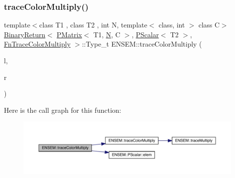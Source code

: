 \subsubsection{\texorpdfstring{traceColorMultiply()}{traceColorMultiply()}\hspace{0.1cm}{\footnotesize\ttfamily [2/3]}}
{\footnotesize\ttfamily template$<$class T1 , class T2 , int N, template$<$ class, int $>$ class C$>$ \\
\mbox{\hyperlink{structENSEM_1_1BinaryReturn}{Binary\+Return}}$<$ \mbox{\hyperlink{classENSEM_1_1PMatrix}{P\+Matrix}}$<$ T1, \mbox{\hyperlink{operator__name__util_8cc_a7722c8ecbb62d99aee7ce68b1752f337}{N}}, C $>$, \mbox{\hyperlink{classENSEM_1_1PScalar}{P\+Scalar}}$<$ T2 $>$, \mbox{\hyperlink{structENSEM_1_1FnTraceColorMultiply}{Fn\+Trace\+Color\+Multiply}} $>$\+::Type\+\_\+t E\+N\+S\+E\+M\+::trace\+Color\+Multiply (\begin{DoxyParamCaption}\item[{const \mbox{\hyperlink{classENSEM_1_1PMatrix}{P\+Matrix}}$<$ T1, \mbox{\hyperlink{operator__name__util_8cc_a7722c8ecbb62d99aee7ce68b1752f337}{N}}, C $>$ \&}]{l,  }\item[{const \mbox{\hyperlink{classENSEM_1_1PScalar}{P\+Scalar}}$<$ T2 $>$ \&}]{r }\end{DoxyParamCaption})\hspace{0.3cm}{\ttfamily [inline]}}

Here is the call graph for this function\+:\nopagebreak
\begin{figure}[H]
\begin{center}
\leavevmode
\includegraphics[width=350pt]{df/d0a/group__primmatrix_ga34f5dfd94ab05f405e04e73c9e342aeb_cgraph}
\end{center}
\end{figure}
\mbox{\label{group__primmatrix_gad73631cec5794d9c294bbf815af14cc0}} 
